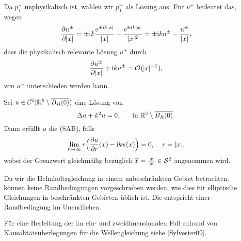\begin{bsp}
	Da \(p_1^-\) unphysikalisch ist, wählen wir \(p_1^+\) als  Lösung aus. Für \(u^\pm\) bedeutet das, wegen
	\begin{equation*}
		\frac{\partial u^\pm}{\partial |x|}=\pm\mathrm{i} k\frac{\mathrm{e}^{\pm\mathrm{i} k|x|}}{|x|}-\frac{\mathrm{e}^{\pm\mathrm{i} k|x|}}{|x|^2}=\pm\mathrm{i} k u^\pm-\frac{u^\pm}{|x|},
	\end{equation*}
	dass die physikalisch relevante Lösung \(u^+\) durch
	\begin{equation*}
		\frac{\partial u^\pm}{\partial |x|}\mp\mathrm{i} ku^\pm=\mathcal{O}(|x|^{-2}),
	\end{equation*}
	von \(u^-\) unterschieden werden kann.
\end{bsp}
\begin{definition}
	Sei \(u\in\mathcal{C}^2(\mathbb{R}^3\setminus\overline{B_R(0)})\) eine Lösung von
	\begin{equation*}
		\Delta u+k^2u=0,\;\;\;\;\;\text{ in }\mathbb{R}^3\setminus\overline{B_R(0)}.
	\end{equation*}
	Dann erfüllt \(u\) die  (\hypertarget{SAB}{SAB}), falls
	\begin{equation}
		\label{sommerfeld ausstrahlungsbedingung}
		\lim_{r\rightarrow\infty}r\Big(\frac{\partial u}{\partial r}(x)-\mathrm{i} ku(x)\Big)=0,\;\;\;\;r=|x|,
	\end{equation}
	wobei der Grenzwert gleichmäßig bezüglich \(\widehat{x}=\frac{x}{|x|}\in\mathcal{S}^2\) angenommen wird.
\end{definition}
\begin{bem}
	Da wir die Helmholtzgleichung in einem unbeschränkten Gebiet betrachten, können keine Randbedingungen vorgeschrieben werden, wie dies für elliptische Gleichungen in beschränkten Gebieten üblich ist. Die \SAB entspricht einer Randbedingung \glqq{}im Unendlichen\grqq{}.
	
	Für eine Herleitung der \SAB im ein- und zweidimensionalen Fall anhand von Kausalitätsüberlegungen für die Wellengleichung siehe [Sylvester09].
\end{bem}
